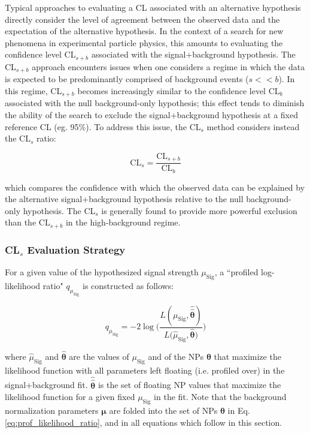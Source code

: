 Typical approaches to evaluating a CL associated with an alternative hypothesis directly consider the level of agreement between the observed data and the expectation of the alternative hypothesis. In the context of a search for new phenomena in experimental particle physics, this amounts to evaluating the confidence level CL\(_{s+b}\) associated with the signal+background hypothesis. The CL\(_{s+b}\) approach encounters issues when one considers a regime in which the data is expected to be predominantly comprised of background events (\(s<<b\)). In this regime, CL\(_{s+b}\) becomes increasingly similar to the confidence level CL\(_{b}\) associated with the null background-only hypothesis; this effect tends to diminish the ability of the search to exclude the signal+background hypothesis at a fixed reference CL (eg. 95\%). To address this issue, the CL\(_s\) method considers instead the CL\(_s\) ratio:

\begin{equation}
\label{eq:CLs_method}
\text{CL}_s = \frac{\text{CL}_{s+b}}{\text{CL}_{b}}
\end{equation}

\noindent which compares the confidence with which the observed data can be explained by the alternative signal+background hypothesis relative to the null background-only hypothesis. The CL\(_s\) is generally found to provide more powerful exclusion than the CL\(_{s+b}\) in the high-background regime.

\subsubsection{CL\(_s\) Evaluation Strategy}

For a given value of the hypothesized signal strength \(\mu_\text{Sig}\), a ``profiled log-likelihood ratio" \(q_{\mu_\text{Sig}}\) is constructed as follows:

\begin{equation}
\label{eq:prof_likelihood_ratio}
q_{\mu_\text{Sig}} = -2\log\Bigg( \frac{L(\mu_\text{Sig}, \boldsymbol{\hat{\hat{\theta}}})}{L(\hat{\mu}_\text{Sig}, \boldsymbol{\hat{\theta})}} \Bigg)
\end{equation}

\noindent where \(\hat{\mu}_\text{Sig}\) and \(\boldsymbol{\hat{\theta}}\) are the values of \(\mu_\text{Sig}\) and of the NPs \(\boldsymbol{\theta}\) that maximize the likelihood function with all parameters left floating (i.e. profiled over) in the signal+background fit. \(\boldsymbol{\hat{\hat{\theta}}}\) is the set of floating NP values that maximize the likelihood function for a given fixed \(\mu_\text{Sig}\) in the fit. Note that the background normalization parameters \(\boldsymbol{\mu}\) are folded into the set of NPs \(\boldsymbol{\theta}\) in Eq. 
\ref{eq:prof_likelihood_ratio}, and in all equations which follow in this section.

